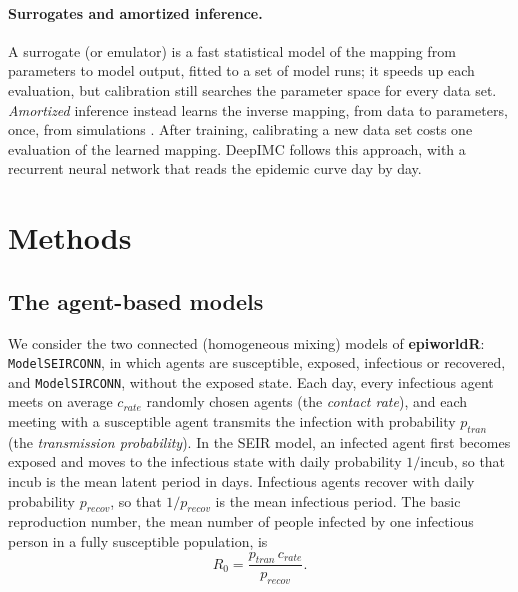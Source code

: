 \documentclass[12pt]{article}
\begin{document}
\paragraph{Surrogates and amortized inference.} A surrogate (or emulator) is a fast statistical
model of the mapping from parameters to model output, fitted to a set of model runs; it speeds up
each evaluation, but calibration still searches the parameter space for every data set.
\emph{Amortized} inference instead learns the inverse mapping, from data to parameters, once, from
simulations \autocite{cranmer2020frontier,radev2022bayesflow}. After training, calibrating a new data
set costs one evaluation of the learned mapping. DeepIMC follows this approach, with a recurrent
neural network that reads the epidemic curve day by day.

\section{Methods}\label{sec:methods}

\subsection{The agent-based models}\label{sec:models}

We consider the two connected (homogeneous mixing) models of \textbf{epiworldR}:
\texttt{ModelSEIRCONN}, in which agents are susceptible, exposed, infectious or recovered, and
\texttt{ModelSIRCONN}, without the exposed state. Each day, every infectious agent meets on average
$c_{rate}$ randomly chosen agents (the \emph{contact rate}), and each meeting with a susceptible
agent transmits the infection with probability $p_{tran}$ (the \emph{transmission probability}).
In the SEIR model, an infected agent first becomes exposed and moves to the infectious state with
daily probability $1/\text{incub}$, so that incub is the mean latent period in days. Infectious
agents recover with daily probability $p_{recov}$, so that $1/p_{recov}$ is the mean infectious
period. The basic reproduction number, the mean number of people infected by one infectious person
in a fully susceptible population, is
\begin{equation}\label{eq:R0}
R_0 = \frac{p_{tran}\, c_{rate}}{p_{recov}}.
\end{equation}
\end{document}
